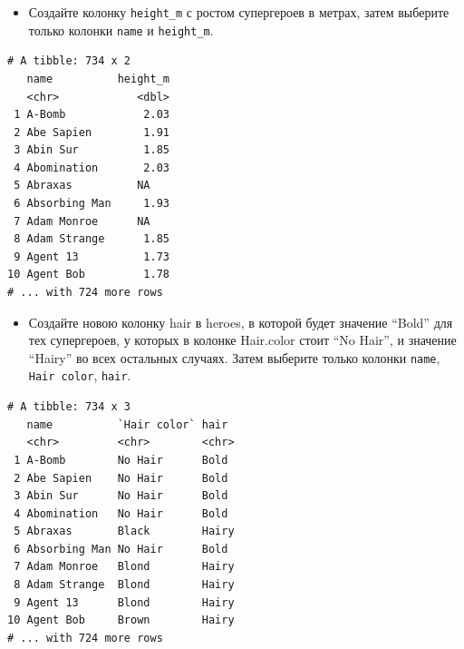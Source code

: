 \documentclass[
]{book}
\newenvironment{Shaded}{\begin{snugshade}}{\end{snugshade}}
\newcommand{\DataTypeTok}[1]{\textcolor[rgb]{0.13,0.29,0.53}{#1}}
\newcommand{\DecValTok}[1]{\textcolor[rgb]{0.00,0.00,0.81}{#1}}
\newcommand{\KeywordTok}[1]{\textcolor[rgb]{0.13,0.29,0.53}{\textbf{#1}}}
\newcommand{\NormalTok}[1]{#1}
\newcommand{\OperatorTok}[1]{\textcolor[rgb]{0.81,0.36,0.00}{\textbf{#1}}}
\newcommand{\StringTok}[1]{\textcolor[rgb]{0.31,0.60,0.02}{#1}}
\providecommand{\tightlist}{%
  \setlength{\itemsep}{0pt}\setlength{\parskip}{0pt}}
\begin{document}
\begin{itemize}
\tightlist
\item
  Создайте колонку \texttt{height\_m} с ростом супергероев в метрах, затем выберите только колонки \texttt{name} и \texttt{height\_m}.
\end{itemize}

\begin{Shaded}
\end{Shaded}

\begin{verbatim}
# A tibble: 734 x 2
   name          height_m
   <chr>            <dbl>
 1 A-Bomb            2.03
 2 Abe Sapien        1.91
 3 Abin Sur          1.85
 4 Abomination       2.03
 5 Abraxas          NA   
 6 Absorbing Man     1.93
 7 Adam Monroe      NA   
 8 Adam Strange      1.85
 9 Agent 13          1.73
10 Agent Bob         1.78
# ... with 724 more rows
\end{verbatim}

\begin{itemize}
\tightlist
\item
  Создайте новою колонку hair в heroes, в которой будет значение ``Bold'' для тех супергероев, у которых в колонке Hair.color стоит ``No Hair'', и значение ``Hairy'' во всех остальных случаях. Затем выберите только колонки \texttt{name}, \texttt{Hair\ color}, \texttt{hair}.
\end{itemize}

\begin{Shaded}
\end{Shaded}

\begin{verbatim}
# A tibble: 734 x 3
   name          `Hair color` hair 
   <chr>         <chr>        <chr>
 1 A-Bomb        No Hair      Bold 
 2 Abe Sapien    No Hair      Bold 
 3 Abin Sur      No Hair      Bold 
 4 Abomination   No Hair      Bold 
 5 Abraxas       Black        Hairy
 6 Absorbing Man No Hair      Bold 
 7 Adam Monroe   Blond        Hairy
 8 Adam Strange  Blond        Hairy
 9 Agent 13      Blond        Hairy
10 Agent Bob     Brown        Hairy
# ... with 724 more rows
\end{verbatim}
\end{document}
